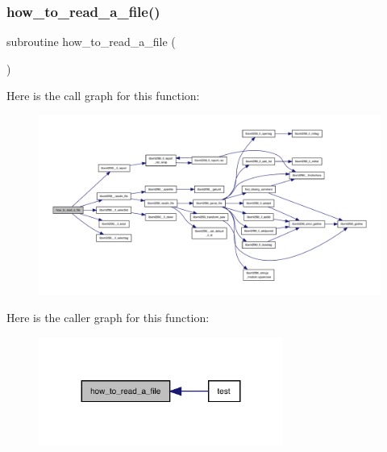 \subsubsection{\texorpdfstring{how\+\_\+to\+\_\+read\+\_\+a\+\_\+file()}{how\_to\_read\_a\_file()}}
{\footnotesize\ttfamily subroutine how\+\_\+to\+\_\+read\+\_\+a\+\_\+file (\begin{DoxyParamCaption}{ }\end{DoxyParamCaption})}

Here is the call graph for this function\+:
\nopagebreak
\begin{figure}[H]
\begin{center}
\leavevmode
\includegraphics[width=350pt]{libxml2f90_8f90__pp_8f90_a5522c3c4e981b0b62e1ddd6f3d77ba44_cgraph}
\end{center}
\end{figure}
Here is the caller graph for this function\+:
\nopagebreak
\begin{figure}[H]
\begin{center}
\leavevmode
\includegraphics[width=227pt]{libxml2f90_8f90__pp_8f90_a5522c3c4e981b0b62e1ddd6f3d77ba44_icgraph}
\end{center}
\end{figure}
\mbox{\label{libxml2f90_8f90__pp_8f90_aaea8089848b0bc51a87636d0afb1a544}} 
